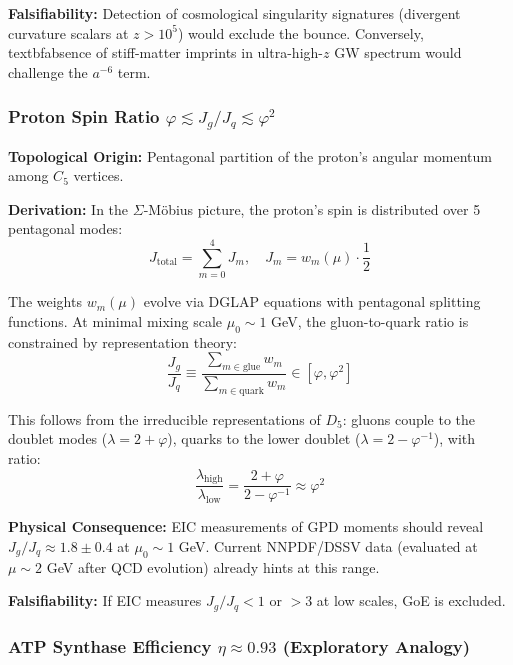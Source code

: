 \documentclass[12pt]{article}
\begin{document}
\textbf{Falsifiability:} Detection of cosmological singularity signatures (divergent curvature scalars at $z > 10^5$) would exclude the bounce. Conversely, \\textbf{absence} of stiff-matter imprints in ultra-high-$z$ GW spectrum would challenge the $a^{-6}$ term.

\subsubsection{Proton Spin Ratio $\varphi \lesssim J_g/J_q \lesssim \varphi^2$}

\textbf{Topological Origin:} Pentagonal partition of the proton's angular momentum among $C_5$ vertices.

\textbf{Derivation:} In the $\Sigma$-M\"obius picture, the proton's spin is distributed over 5 pentagonal modes:
\begin{equation}
J_{\text{total}} = \sum_{m=0}^4 J_m, \quad J_m = w_m(\mu) \cdot \frac{1}{2}
\end{equation}

The weights $w_m(\mu)$ evolve via DGLAP equations with pentagonal splitting functions. At minimal mixing scale $\mu_0 \sim 1$ GeV, the gluon-to-quark ratio is constrained by representation theory:
\begin{equation}
\frac{J_g}{J_q} \equiv \frac{\sum_{m \in \text{glue}} w_m}{\sum_{m \in \text{quark}} w_m} \in \left[\varphi, \varphi^2\right]
\end{equation}

This follows from the irreducible representations of $D_5$: gluons couple to the doublet modes ($\lambda = 2 + \varphi$), quarks to the lower doublet ($\lambda = 2 - \varphi^{-1}$), with ratio:
\begin{equation}
\frac{\lambda_{\text{high}}}{\lambda_{\text{low}}} = \frac{2 + \varphi}{2 - \varphi^{-1}} \approx \varphi^2
\end{equation}

\textbf{Physical Consequence:} EIC measurements of GPD moments should reveal $J_g/J_q \approx 1.8 \pm 0.4$ at $\mu_0 \sim 1$ GeV. Current NNPDF/DSSV data (evaluated at $\mu \sim 2$ GeV after QCD evolution) already hints at this range.

\textbf{Falsifiability:} If EIC measures $J_g/J_q < 1$ or $> 3$ at low scales, GoE is excluded.

\subsubsection{ATP Synthase Efficiency $\eta \approx 0.93$ (Exploratory Analogy)}
\end{document}
